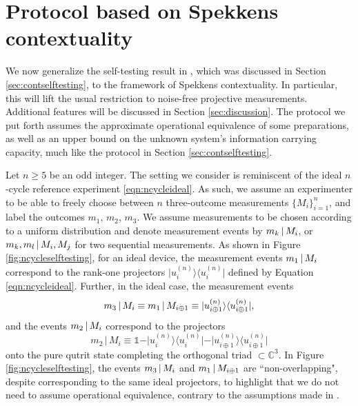 \chapter{Protocol based on Spekkens contextuality}
\label{sec:protocols}
We now generalize the self-testing result in \cite{Bharti2019}, which was discussed in Section \ref{sec:contselftesting}, to the framework of Spekkens contextuality. In particular, this will lift the usual restriction to noise-free projective measurements. Additional features will be discussed in Section \ref{sec:discussion}. The protocol we put forth assumes the approximate operational equivalence of some preparations, as well as an upper bound on the unknown system's information carrying capacity, much like the protocol in Section \ref{sec:contselftesting}.

Let $n\geq 5$ be an odd integer. The setting we consider is reminiscent of the ideal $n$-cycle reference experiment \ref{eqn:ncycleideal}. As such, we assume an experimenter to be able to freely choose between $n$ three-outcome measurements $\{M_i\}_{i=1}^n$, and label the outcomes $m_1$, $m_2$, $m_3$. We assume measurements to be chosen according to a uniform distribution and denote measurement events by  $m_k\thinspace\vert\thinspace M_i$, or $m_k,m_l\thinspace\vert\thinspace M_i,M_j$ for two sequential measurements. As shown in Figure \ref{fig:ncycleselftesting}, for an ideal device, the measurement events $m_1 \thinspace\vert\thinspace M_i$ correspond to the rank-one projectors $\vert u_i^{(n)}\rangle\langle u_i^{(n)}\vert$ defined by Equation \ref{eqn:ncycleideal}. Further, in the ideal case, the measurement events \begin{equation*}
m_3\thinspace\vert\thinspace M_i\equiv m_1\thinspace\vert\thinspace M_{i\oplus 1}\equiv\vert u_{i\oplus 1}^{(n)}\rangle\langle u_{i\oplus 1}^{(n)}\vert,
\end{equation*}and the events $m_2\thinspace\vert\thinspace M_i$ correspond to the projectors 
\begin{equation*}
m_2\,\vert\,M_i\equiv \mathbb{1}-\vert u_i^{(n)}\rangle\langle u_i^{(n)}\vert-\vert u_{i\oplus 1}^{(n)}\rangle\langle u_{i\oplus 1}^{(n)}\vert
\end{equation*} onto the pure qutrit state completing the orthogonal triad $\subset \mathbb{C}^3$. In Figure \ref{fig:ncycleselftesting}, the events $m_3\thinspace \vert\thinspace M_i$ and $m_1\thinspace\vert\thinspace M_{i\oplus 1}$ are ``non-overlapping", despite corresponding to the same ideal projectors, to highlight that we do not need to assume operational equivalence, contrary to the assumptions made in \cite{Kunjwal2019}.

